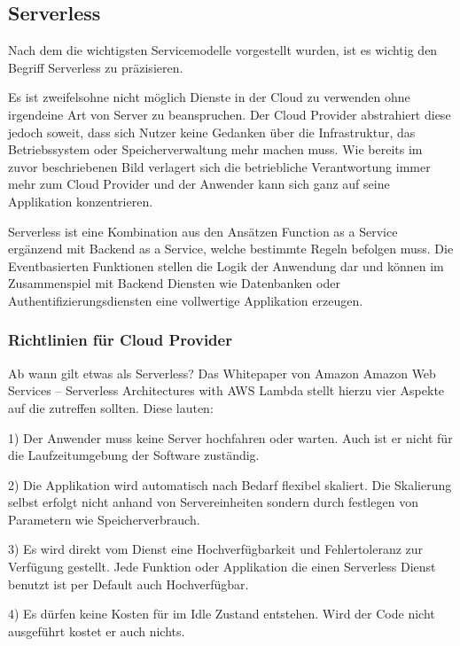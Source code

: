 \subsection{Serverless}

Nach dem die wichtigsten Servicemodelle vorgestellt wurden, ist es wichtig den Begriff Serverless
zu präzisieren.


Es ist zweifelsohne nicht möglich Dienste in der Cloud zu verwenden ohne irgendeine Art von Server zu beanspruchen.
Der Cloud Provider abstrahiert diese jedoch soweit, dass sich Nutzer keine Gedanken über
die Infrastruktur, das Betriebssystem oder Speicherverwaltung mehr machen muss.
Wie bereits im zuvor beschriebenen Bild verlagert sich die betriebliche Verantwortung immer mehr zum
Cloud Provider und der Anwender kann sich ganz auf seine Applikation konzentrieren.

Serverless ist eine Kombination aus den Ansätzen Function as a Service ergänzend mit Backend as a Service,
welche bestimmte Regeln befolgen muss.
Die Eventbasierten Funktionen stellen die Logik der Anwendung dar und können im Zusammenspiel mit
Backend Diensten wie Datenbanken oder Authentifizierungsdiensten eine vollwertige Applikation erzeugen.



\subsubsection{Richtlinien für Cloud Provider }

Ab wann gilt etwas als Serverless?
Das Whitepaper von Amazon \glqq Amazon Web Services – Serverless Architectures with AWS Lambda\grqq{} \cite[]{AWSWhitepaper}
stellt hierzu vier Aspekte auf die zutreffen sollten. Diese lauten:

1) Der Anwender muss keine Server hochfahren oder warten. Auch ist er nicht für die Laufzeitumgebung der Software
zuständig.

2) Die Applikation wird automatisch nach Bedarf flexibel skaliert. Die Skalierung selbst erfolgt nicht anhand von Servereinheiten
sondern durch festlegen von Parametern wie Speicherverbrauch.

3) Es wird direkt vom Dienst eine Hochverfügbarkeit und Fehlertoleranz zur Verfügung gestellt. Jede Funktion oder Applikation die
einen Serverless Dienst benutzt ist per Default auch Hochverfügbar.

4) Es dürfen keine Kosten für im Idle Zustand entstehen. Wird der Code nicht ausgeführt kostet er auch nichts.



